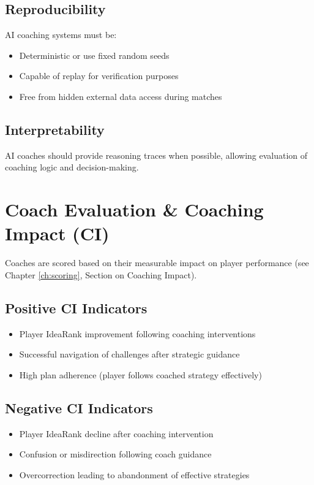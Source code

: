 \subsection{Reproducibility}

AI coaching systems must be:
\begin{itemize}[leftmargin=*]
  \item Deterministic or use fixed random seeds
  \item Capable of replay for verification purposes
  \item Free from hidden external data access during matches
\end{itemize}

\subsection{Interpretability}

AI coaches should provide reasoning traces when possible, allowing evaluation of coaching logic and decision-making.

\section{Coach Evaluation \& Coaching Impact (CI)}

Coaches are scored based on their measurable impact on player performance (see Chapter \ref{ch:scoring}, Section on Coaching Impact).

\subsection{Positive CI Indicators}
\begin{itemize}[leftmargin=*]
  \item Player IdeaRank improvement following coaching interventions
  \item Successful navigation of challenges after strategic guidance
  \item High plan adherence (player follows coached strategy effectively)
\end{itemize}

\subsection{Negative CI Indicators}
\begin{itemize}[leftmargin=*]
  \item Player IdeaRank decline after coaching intervention
  \item Confusion or misdirection following coach guidance
  \item Overcorrection leading to abandonment of effective strategies
\end{itemize}


